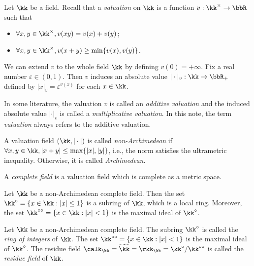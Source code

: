     \begin{remark}\label{rmk:additive_and_multiplicative_valuation_on_a_field}
        Let \(\kk\) be a field.
        Recall that a \emph{valuation} on \(\kk\) is a function \(v: \kk^\times \to \bbR\) such that
        \begin{itemize}
            \item \(\forall x,y \in \kk^\times, v(xy) = v(x) + v(y)\);
            \item \(\forall x,y \in \kk^\times, v(x + y) \geq \min\{v(x), v(y)\}\).
        \end{itemize}
        We can extend \(v\) to the whole field \(\kk\) by defining \(v(0) = +\infty\).
        Fix a real number \(\varepsilon \in (0,1)\).
        Then \(v\) induces an absolute value \(|\cdot|_v: \kk \to \bbR_+\) defined by \(|x|_v = \varepsilon^{v(x)}\) for each \(x \in \kk\).

        In some literature, the valuation \(v\) is called an \emph{additive valuation} and the induced absolute value \(|\cdot|_v\) is called a \emph{multiplicative valuation}.
        In this note, the term \emph{valuation} always refers to the additive valuation.
    \end{remark}

    \begin{definition}\label{def:non-archimedean_valuation}
        A valuation field \((\kk, |\cdot|)\) is called \emph{non-Archimedean} if \(\forall x,y \in \kk, |x + y| \leq \max\{|x|, |y|\}\), i.e., the norm satisfies the ultrametric inequality.
        Otherwise, it is called \emph{Archimedean}.
    \end{definition}
    
    \begin{definition}\label{def:complete_field}
        A \emph{complete field} is a valuation field which is complete as a metric space.
    \end{definition}

    \begin{lemma}\label{lem:ring_of_integers_of_non-archimedean_field}
        Let \(\kk\) be a non-Archimedean complete field.
        Then the set \(\kk^\circ = \{x \in \kk : |x| \leq 1\}\) is a subring of \(\kk\), which is a local ring.
        Moreover, the set \(\kk^{\circ\circ} = \{x \in \kk : |x| < 1\}\) is the maximal ideal of \(\kk^\circ\).
    \end{lemma}

    \begin{definition}\label{def:ring_of_integers_of_non-archimedean_field}
        Let \(\kk\) be a non-Archimedean complete field.
        The subring \(\kk^\circ\) is called the \emph{ring of integers} of \(\kk\).
        The set \(\kk^{\circ\circ} = \{x \in \kk : |x| < 1\}\) is the maximal ideal of \(\kk^\circ\).
        The residue field \(\calk_\kk = \widetilde{\kk} = \rkk_\kk = \kk^\circ / \kk^{\circ\circ}\) is called the \emph{residue field} of \(\kk\).
    \end{definition}

